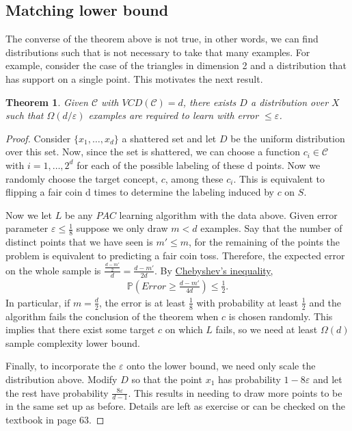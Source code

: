 \documentclass[12pt, letterpaper]{article}
\numberwithin{equation}{section} %
\newcommand{\mb}{\mathbb}
\newcommand{\mc}{\mathcal}
\newcommand{\ve}{\varepsilon}
\newtheorem{theorem}{Theorem}[section]
\theoremstyle{definition}
\theoremstyle{remark}
\begin{document}
\subsection{Matching lower bound}
The converse of the theorem above is not true, in other words, we can find distributions such that is not necessary to take that many examples. For example, consider the case of the triangles in dimension 2 and a distribution that has support on a single point. This motivates the next result.

\begin{theorem}
    Given $\mc C$ with $VCD(\mc C)=d$, there exists $D$ a distribution over $X$ such that $\Omega(d/\ve)$ examples are required to learn with error $\leq \ve$.
\end{theorem}
\begin{proof}
    Consider $\lbrace x_1,\ldots,x_d\rbrace$ a shattered set and let $D$ be the uniform distribution over this set. Now, since the set is shattered, we can choose a function $c_i\in \mc C$ with $i=1,\ldots,2^d$  for each of the possible labeling of these d points. Now we randomly choose the target concept, $c$, among these $c_i$. This is equivalent to flipping a fair coin d times to determine the labeling induced by $c$ on $S$.
    
    Now we let $L$ be any $PAC$ learning algorithm with the data above. Given error parameter $\ve \leq \frac18$ suppose we only draw $m < d$ examples. Say that the number of distinct points that we have seen is $m' \leq m$,  for the remaining of the points the problem is equivalent to predicting a fair coin toss. Therefore, the expected error on the whole sample is $\frac{\frac{d-m'}2}d = \frac{d-m'}{2d}.$ By \href{https://en.wikipedia.org/wiki/Markov's_inequality}{Chebyshev's inequality},
    \begin{align}
        \mb P\left(Error\geq \frac{d-m'}{4d}\right) \leq \frac12.
    \end{align}
    In particular, if $m=\frac d2$, the error is at least $\frac 18$ with probability at least $\frac 12$ and the algorithm fails the conclusion of the theorem when $c$ is chosen randomly. This implies that there exist some target $c$ on which $L$ fails, so we need at least $\Omega(d)$ sample complexity lower bound.
    
    Finally, to incorporate the $\ve$ onto the lower bound, we need only scale the distribution above. Modify $D$ so that  the point $x_1$ has  probability $1-8\ve$ and let the rest have probability $\frac{8\ve}{d-1}$. This results in needing to draw more points to be in the same set up as before. Details are left as exercise or can be checked on the textbook in page 63.
\end{proof}
\end{document}

